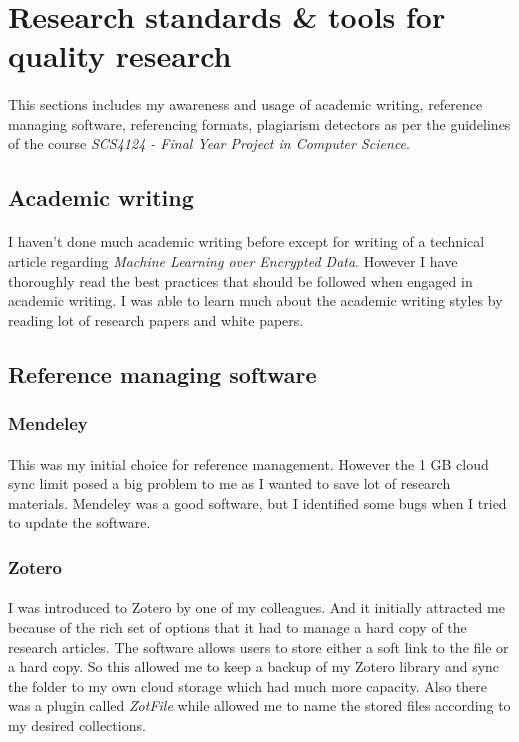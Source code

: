 \section{Research standards \& tools for quality research}

\paragraph{}
This sections includes my awareness and usage of academic writing, 
reference managing software, referencing formats, plagiarism detectors as per 
the guidelines of the course \emph{SCS4124 - Final Year Project in Computer Science}.

\subsection{Academic writing}
\paragraph{}
I haven't done much academic writing before except for writing of a technical
article regarding \emph{Machine Learning over Encrypted Data}. However I have 
thoroughly read the best practices that should be followed when engaged in academic
writing. I was able to learn much about the academic writing styles by reading 
lot of research papers and white papers. 

\subsection{Reference managing software}

\subsubsection{Mendeley}
\paragraph{}
This was my initial choice for reference management. However the 1 GB 
cloud sync limit posed a big problem to me as I wanted to save lot of research 
materials. Mendeley was a good software, but I identified some bugs when I tried
to update the software. 

\subsubsection{Zotero}
\paragraph{}
I was introduced to Zotero by one of my colleagues. And it initially attracted
me because of the rich set of options that it had to manage a hard copy of the research 
articles. The software allows users to store either a soft link to the file or 
a hard copy. So this allowed me to keep a backup of my Zotero library and sync the 
folder to my own cloud storage which had much more capacity. Also there was a 
plugin called \emph{ZotFile} while allowed me to name the stored files according to
my desired collections. 

